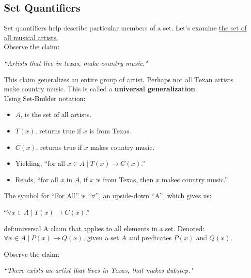 \subsection{Set Quantifiers}
Set quantifiers help describe particular members of a set. Let's examine \underline{the set of
    all musical artists.}\\

\noindent
Observe the claim:

\begin{center}
    \Large
    \textit{``Artists that live in texas, make country music."}
\end{center}

\noindent
This claim generalizes an entire group of artist. Perhaps not all
Texan artists make country music. This is called a {\textbf{universal generalization}}.\\

\noindent
Using Set-Builder notation:
\begin{itemize}
    \item $A$, is the set of all artists.
    \item $T(x)$, returns true if $x$ is from Texas.
    \item $C(x)$, returns true if $x$ makes country music.
    \item Yielding, ``for all $x\in A \mid T(x) \rightarrow C(x)$.''
    \item Reads, \underline{``for all $x$ in $A$, if $x$ is from Texas, then $x$ makes country music.''}
\end{itemize}

\noindent
The symbol for \underline{``For All'' is ``$\forall$''}, an upside-down ``A'', which gives us:

\begin{center}
    \Large
    ``$\forall x \in A \mid T(x) \rightarrow C(x)$.''
\end{center}

\newpage

\begin{Def}{def:universal}
    A claim that applies to all elements in a set.
    Denoted: $\forall x \in A \mid P(x) \rightarrow Q(x)$, given a set $A$ and predicates $P(x)$ and $Q(x)$.
\end{Def}

\noindent
Observe the claim:

\begin{center}
    \Large
    \textit{``There exists an artist that lives in Texas, that makes dubstep."}
\end{center}

